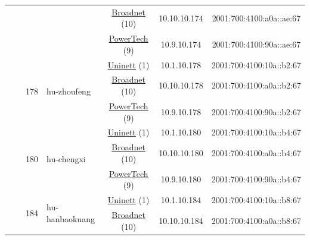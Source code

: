 \begin{small}
\begin{center}
\begin{longtable}{|c|c|c|c|c|c|c|c|}
  &  &  &  & \multicolumn{2}{|c|}{\tiny{\href{https://www.broadnet.no}{Broadnet} (10)}} & \tiny{10.10.10.174} & \tiny{2001:700:4100:a0a::ae:67} \\* \cline{5-5}\cline{6-6}\cline{7-7}\cline{8-8}
  &  &  &  & \multicolumn{2}{|c|}{\tiny{\href{http://www.powertech.no}{PowerTech} (9)}} & \tiny{10.9.10.174} & \tiny{2001:700:4100:90a::ae:67} \\* \cline{3-3}\cline{4-4}\cline{5-5}\cline{6-6}\cline{7-7}\cline{8-8}
  &  & \multirow{3}{*}{\tiny{178}} & \multicolumn{1}{|l|}{\multirow{3}{*}{\tiny{hu-zhoufeng}}} & \multicolumn{2}{|c|}{\tiny{\href{https://www.uninett.no}{Uninett} (1)}} & \tiny{10.1.10.178} & \tiny{2001:700:4100:10a::b2:67} \\* \cline{5-5}\cline{6-6}\cline{7-7}\cline{8-8}
  &  &  &  & \multicolumn{2}{|c|}{\tiny{\href{https://www.broadnet.no}{Broadnet} (10)}} & \tiny{10.10.10.178} & \tiny{2001:700:4100:a0a::b2:67} \\* \cline{5-5}\cline{6-6}\cline{7-7}\cline{8-8}
  &  &  &  & \multicolumn{2}{|c|}{\tiny{\href{http://www.powertech.no}{PowerTech} (9)}} & \tiny{10.9.10.178} & \tiny{2001:700:4100:90a::b2:67} \\* \cline{3-3}\cline{4-4}\cline{5-5}\cline{6-6}\cline{7-7}\cline{8-8}
  &  & \multirow{3}{*}{\tiny{180}} & \multicolumn{1}{|l|}{\multirow{3}{*}{\tiny{hu-chengxi}}} & \multicolumn{2}{|c|}{\tiny{\href{https://www.uninett.no}{Uninett} (1)}} & \tiny{10.1.10.180} & \tiny{2001:700:4100:10a::b4:67} \\* \cline{5-5}\cline{6-6}\cline{7-7}\cline{8-8}
  &  &  &  & \multicolumn{2}{|c|}{\tiny{\href{https://www.broadnet.no}{Broadnet} (10)}} & \tiny{10.10.10.180} & \tiny{2001:700:4100:a0a::b4:67} \\* \cline{5-5}\cline{6-6}\cline{7-7}\cline{8-8}
  &  &  &  & \multicolumn{2}{|c|}{\tiny{\href{http://www.powertech.no}{PowerTech} (9)}} & \tiny{10.9.10.180} & \tiny{2001:700:4100:90a::b4:67} \\* \cline{3-3}\cline{4-4}\cline{5-5}\cline{6-6}\cline{7-7}\cline{8-8}
  &  & \multirow{3}{*}{\tiny{184}} & \multicolumn{1}{|l|}{\multirow{3}{*}{\tiny{hu-hanbaokuang}}} & \multicolumn{2}{|c|}{\tiny{\href{https://www.uninett.no}{Uninett} (1)}} & \tiny{10.1.10.184} & \tiny{2001:700:4100:10a::b8:67} \\* \cline{5-5}\cline{6-6}\cline{7-7}\cline{8-8}
  &  &  &  & \multicolumn{2}{|c|}{\tiny{\href{https://www.broadnet.no}{Broadnet} (10)}} & \tiny{10.10.10.184} & \tiny{2001:700:4100:a0a::b8:67} \\* \cline{5-5}\cline{6-6}\cline{7-7}\cline{8-8}

\end{longtable}
\end{center}
\end{small}
